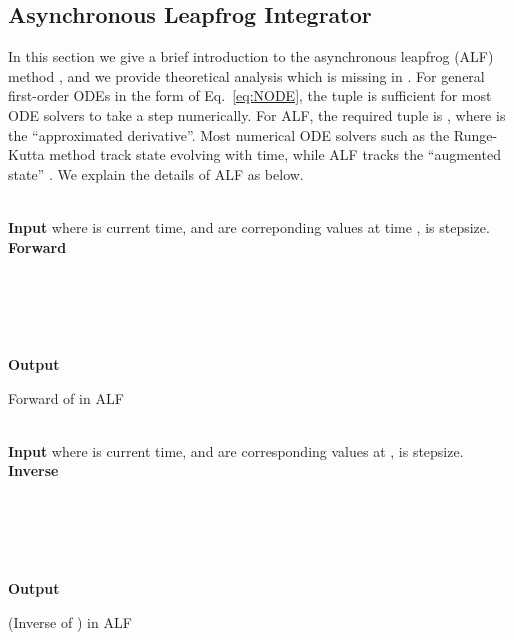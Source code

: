 \documentclass{article} \usepackage{iclr2021_conference,times}
\begin{document}
\subsection{Asynchronous Leapfrog Integrator}
\label{subsec:ALF}
In this section we give a brief introduction to the asynchronous leapfrog (ALF) method \citep{mutze2013asynchronous}, and we provide theoretical analysis which is missing in \citet{mutze2013asynchronous}. 
For general first-order ODEs in the form of Eq.~\ref{eq:NODE}, the tuple  is sufficient for most ODE solvers to take a step numerically. For ALF, the required tuple is , where  is the ``approximated derivative''. Most numerical ODE solvers such as the Runge-Kutta method \citep{runge1895numerische} track state  evolving with time, while ALF tracks the ``augmented state'' .
We explain the details of ALF as below. 
\begin{minipage}{0.48\textwidth}
\begin{algorithm}[H]
\label{alg:ALF_forward}
 \\
\textbf{Input}  where  is current time,  and  are correponding values at time ,  is stepsize.\\
\textbf{Forward} \hspace{3mm} \\
\hspace{16mm}  \\
\hspace{16mm}  \\
\hspace{16mm}  \\
\hspace{16mm}  \\
\hspace{16mm}  \\
\textbf{Output} \hspace{4mm}\scalebox{0.95}{}
\caption{Forward of  in ALF}
\end{algorithm}
\end{minipage}
\hfill
\begin{minipage}{0.48\textwidth}
\begin{algorithm}[H]
\label{alg:ALF_inverse}
 \\
\textbf{Input}  where  is current time,  and  are corresponding values at ,  is stepsize.\\
\textbf{Inverse} \hspace{5mm} \\
\hspace{16mm}  \\
\hspace{16mm}  \\
\hspace{16mm}  \\
\hspace{16mm}  \\
\hspace{16mm}  \\
\textbf{Output} \hspace{4mm} 
\caption{  (Inverse of ) in ALF}
\end{algorithm}
\end{minipage}
\end{document}
